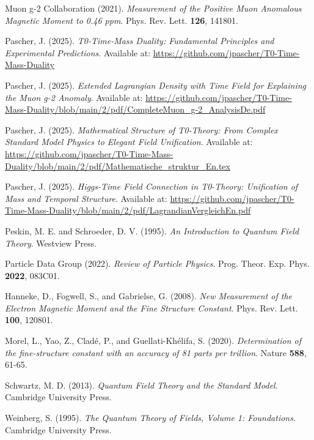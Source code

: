 \documentclass[12pt,a4paper]{article}
\theoremstyle{definition}
\begin{document}
	\begin{thebibliography}{20}
		
		Muon g-2 Collaboration (2021). 
		\textit{Measurement of the Positive Muon Anomalous Magnetic Moment to 0.46 ppm}. 
		Phys. Rev. Lett. \textbf{126}, 141801.
		
		Pascher, J. (2025). 
		\textit{T0-Time-Mass Duality: Fundamental Principles and Experimental Predictions}. 
		Available at: \url{https://github.com/jpascher/T0-Time-Mass-Duality}
		
		Pascher, J. (2025). 
		\textit{Extended Lagrangian Density with Time Field for Explaining the Muon g-2 Anomaly}. 
		Available at: \url{https://github.com/jpascher/T0-Time-Mass-Duality/blob/main/2/pdf/CompleteMuon_g-2_AnalysisDe.pdf}
		
		Pascher, J. (2025). 
		\textit{Mathematical Structure of T0-Theory: From Complex Standard Model Physics to Elegant Field Unification}. 
		Available at: \url{https://github.com/jpascher/T0-Time-Mass-Duality/blob/main/2/pdf/Mathematische_struktur_En.tex}
		
		Pascher, J. (2025). 
		\textit{Higgs-Time Field Connection in T0-Theory: Unification of Mass and Temporal Structure}. 
		Available at: \url{https://github.com/jpascher/T0-Time-Mass-Duality/blob/main/2/pdf/LagrandianVergleichEn.pdf}
		
		Peskin, M. E. and Schroeder, D. V. (1995). 
		\textit{An Introduction to Quantum Field Theory}. 
		Westview Press.
		
		Particle Data Group (2022). 
		\textit{Review of Particle Physics}. 
		Prog. Theor. Exp. Phys. \textbf{2022}, 083C01.
		
		Hanneke, D., Fogwell, S., and Gabrielse, G. (2008). 
		\textit{New Measurement of the Electron Magnetic Moment and the Fine Structure Constant}. 
		Phys. Rev. Lett. \textbf{100}, 120801.
		
		Morel, L., Yao, Z., Cladé, P., and Guellati-Khélifa, S. (2020). 
		\textit{Determination of the fine-structure constant with an accuracy of 81 parts per trillion}. 
		Nature \textbf{588}, 61-65.
		
		Schwartz, M. D. (2013). 
		\textit{Quantum Field Theory and the Standard Model}. 
		Cambridge University Press.
		
		Weinberg, S. (1995). 
		\textit{The Quantum Theory of Fields, Volume 1: Foundations}. 
		Cambridge University Press.
		
	\end{thebibliography}
	
\end{document}
